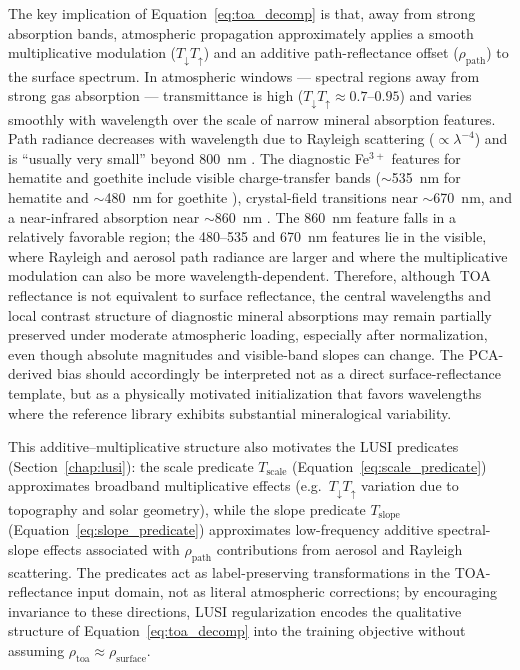 \documentclass[11pt]{report}
\begin{document}
The key implication of Equation~\ref{eq:toa_decomp} is that, away from strong absorption bands, atmospheric propagation approximately applies a smooth multiplicative modulation ($T_{\downarrow} T_{\uparrow}$) and an additive path-reflectance offset ($\rho_{\text{path}}$) to the surface spectrum. In atmospheric windows --- spectral regions away from strong gas absorption --- transmittance is high ($T_{\downarrow} T_{\uparrow} \approx 0.7$--$0.95$) and varies smoothly with wavelength over the scale of narrow mineral absorption features. Path radiance decreases with wavelength due to Rayleigh scattering ($\propto \lambda^{-4}$) and is ``usually very small'' beyond 800~nm \cite{richter_atcor_atbd}. The diagnostic Fe$^{3+}$ features for hematite and goethite include visible charge-transfer bands ($\sim$535~nm for hematite and $\sim$480~nm for goethite \cite{Jiang2014AlGoethite}), crystal-field transitions near $\sim$670~nm, and a near-infrared absorption near $\sim$860~nm \cite{clark1999,sherman1985,wang2022hyspex}. The 860~nm feature falls in a relatively favorable region; the 480--535 and 670~nm features lie in the visible, where Rayleigh and aerosol path radiance are larger and where the multiplicative modulation can also be more wavelength-dependent. Therefore, although TOA reflectance is not equivalent to surface reflectance, the central wavelengths and local contrast structure of diagnostic mineral absorptions may remain partially preserved under moderate atmospheric loading, especially after normalization, even though absolute magnitudes and visible-band slopes can change. The PCA-derived bias should accordingly be interpreted not as a direct surface-reflectance template, but as a physically motivated initialization that favors wavelengths where the reference library exhibits substantial mineralogical variability.

This additive--multiplicative structure also motivates the LUSI predicates (Section~\ref{chap:lusi}): the scale predicate $T_{\text{scale}}$ (Equation~\ref{eq:scale_predicate}) approximates broadband multiplicative effects (e.g.\ $T_{\downarrow} T_{\uparrow}$ variation due to topography and solar geometry), while the slope predicate $T_{\text{slope}}$ (Equation~\ref{eq:slope_predicate}) approximates low-frequency additive spectral-slope effects associated with $\rho_{\text{path}}$ contributions from aerosol and Rayleigh scattering. The predicates act as label-preserving transformations in the TOA-reflectance input domain, not as literal atmospheric corrections; by encouraging invariance to these directions, LUSI regularization encodes the qualitative structure of Equation~\ref{eq:toa_decomp} into the training objective without assuming $\rho_{\text{toa}} \approx \rho_{\text{surface}}$.
\end{document}
